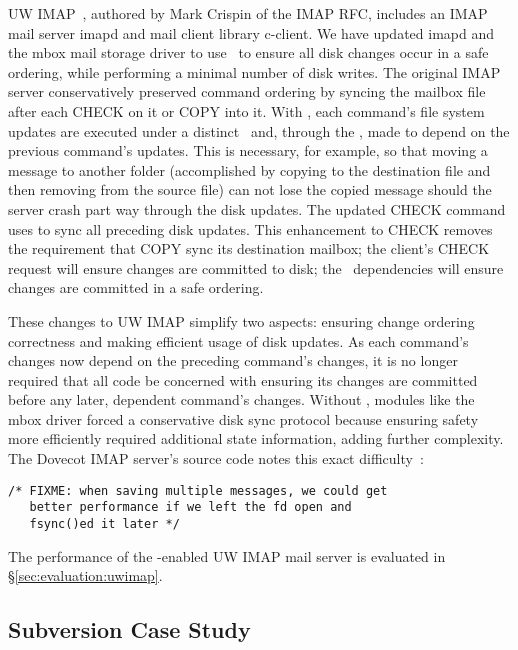 UW IMAP~\cite{uwimap}, authored by Mark Crispin of the IMAP RFC,
includes an IMAP mail server imapd and mail client library c-client.
We have updated imapd and the mbox mail storage driver to use
\opgroups\ to ensure all disk changes occur in a safe ordering, while
performing a minimal number of disk writes.
%
The original IMAP server conservatively preserved command ordering by
syncing the mailbox file after each CHECK on it or COPY into it. With
\opgroups, each command's file system updates are executed under a
distinct \opgroup\ and, through the \opgroup, made to depend on the
previous command's updates. This is necessary, for example, so that
moving a message to another folder (accomplished by copying to the
destination file and then removing from the source file) can not lose
the copied message should the server crash part way through the disk
updates.
%
The updated CHECK command uses \opgroupSync to sync all preceding disk
updates. This enhancement to CHECK removes the requirement that COPY
sync its destination mailbox; the client's CHECK request will ensure
changes are committed to disk; the \opgroup\ dependencies will ensure
changes are committed in a safe ordering.

These changes to UW IMAP simplify two aspects:
%
ensuring change ordering correctness
%
and making efficient usage of disk updates.
%
As each command's changes now depend on the preceding command's
changes, it is no longer required that all code be concerned with
ensuring its changes are committed before any later, dependent
command's changes. Without \opgroups, modules like the mbox driver
forced a conservative disk sync protocol because ensuring safety more
efficiently required additional state information, adding further
complexity. The Dovecot IMAP server's source code notes this exact
difficulty~\cite[maildir-save.c]{dovecot}:

\vspace{-0.5\baselineskip}
\begin{scriptsize}
\begin{verbatim}
/* FIXME: when saving multiple messages, we could get
   better performance if we left the fd open and
   fsync()ed it later */
\end{verbatim}
\end{scriptsize}
\vspace{-0.5\baselineskip}

The performance of the \opgroup{}-enabled UW IMAP mail server is
evaluated in \S\ref{sec:evaluation:uwimap}.

\subsection{Subversion Case Study}
\label{sec:opgroup:svn}

